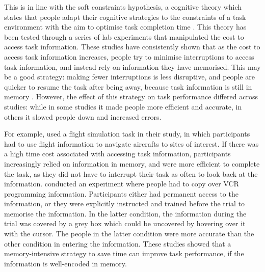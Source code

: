 This is in line with the soft constraints hypothesis, a cognitive theory which states that people adapt their cognitive strategies to the constraints of a task environment with the aim to optimise task completion time \citep{Gray2006}. This theory has been tested through a series of lab experiments that manipulated the cost to access task information. These studies have consistently shown that as the cost to access task information increases, people try to minimise interruptions to access task information, and instead rely on information they have memorised. This may be a good strategy: making fewer interruptions is less disruptive, and people are quicker to resume the task after being away, because task information is still in memory \citep{Morgan2009}. However, the effect of this strategy on task performance differed across studies: while in some studies it made people more efficient and accurate, in others it slowed people down and increased errors. 

For example, \citet{Waldron2007} used a flight simulation task in their study, in which participants had to use flight information to navigate aircrafts to sites of interest. If there was a high time cost associated with accessing task information, participants increasingly relied on information in memory, and were more efficient to complete the task, as they did not have to interrupt their task as often to look back at the information. \citet{Gray2004} conducted an experiment where people had to copy over VCR programming information. Participants either had permanent access to the information, or they were explicitly instructed and trained before the trial to memorise the information. In the latter condition, the information during the trial was covered by a grey box which could be uncovered by hovering over it with the cursor. The people in the latter condition were more accurate than the other condition in entering the information. These studies showed that a memory-intensive strategy to save time can improve task performance, if the information is well-encoded in memory.

